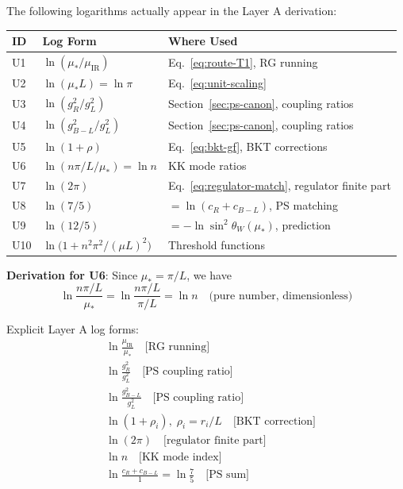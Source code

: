 \documentclass[11pt,a4paper]{article}
\begin{document}
The following logarithms actually appear in the Layer A derivation:

\begin{center}
\begin{tabular}{lll}
\toprule
\textbf{ID} & \textbf{Log Form} & \textbf{Where Used} \\
\midrule
U1 & $\ln(\mu_*/\mu_{\text{IR}})$ & Eq.~\eqref{eq:route-T1}, RG running \\
U2 & $\ln(\mu_* L) = \ln\pi$ & Eq.~\eqref{eq:unit-scaling} \\
U3 & $\ln(g_R^2/g_L^2)$ & Section~\ref{sec:ps-canon}, coupling ratios \\
U4 & $\ln(g_{B-L}^2/g_L^2)$ & Section~\ref{sec:ps-canon}, coupling ratios \\
U5 & $\ln(1+\rho)$ & Eq.~\eqref{eq:bkt-gf}, BKT corrections \\
U6 & $\ln(n\pi/L / \mu_*) = \ln n$ & KK mode ratios \\
U7 & $\ln(2\pi)$ & Eq.~\eqref{eq:regulator-match}, regulator finite part \\
U8 & $\ln(7/5)$ & $= \ln(c_R + c_{B-L})$, PS matching \\
U9 & $\ln(12/5)$ & $= -\ln\sin^2\theta_W(\mu_*)$, prediction \\
U10 & $\ln\bigl(1 + n^2\pi^2/(\mu L)^2\bigr)$ & Threshold functions \\
\bottomrule
\end{tabular}
\end{center}

\textbf{Derivation for U6}: Since $\mu_* = \pi/L$, we have
\begin{equation}
\label{eq:log-kk-derivation}
\ln\frac{n\pi/L}{\mu_*} = \ln\frac{n\pi/L}{\pi/L} = \ln n \quad \text{(pure number, dimensionless)}
\end{equation}

Explicit Layer A log forms:
\begin{align}
\label{eq:log-used-1} &\ln\frac{\mu_{\text{IR}}}{\mu_*} \quad \text{[RG running]} \\
\label{eq:log-used-2} &\ln\frac{g_R^2}{g_L^2} \quad \text{[PS coupling ratio]} \\
\label{eq:log-used-3} &\ln\frac{g_{B-L}^2}{g_L^2} \quad \text{[PS coupling ratio]} \\
\label{eq:log-used-4} &\ln(1+\rho_i), \; \rho_i = r_i/L \quad \text{[BKT correction]} \\
\label{eq:log-used-5} &\ln(2\pi) \quad \text{[regulator finite part]} \\
\label{eq:log-used-6} &\ln n \quad \text{[KK mode index]} \\
\label{eq:log-used-7} &\ln\frac{c_R + c_{B-L}}{1} = \ln\frac{7}{5} \quad \text{[PS sum]}
\end{align}
\end{document}
